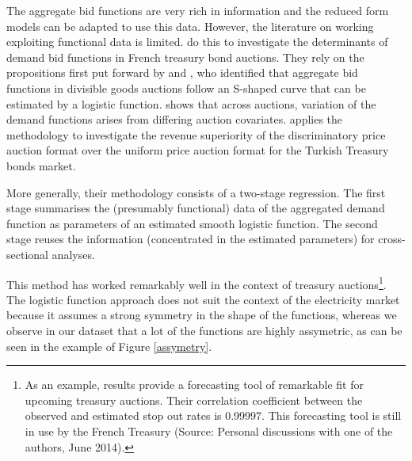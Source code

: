 The aggregate bid functions are very rich in information and the reduced form models can be adapted to use this data. However, the literature on working exploiting functional data is limited. \cite{pw2002etude} do this to investigate the determinants of demand bid functions in French treasury bond auctions. They rely on the propositions first put forward by %
\cite{boukai1998market}
and 
\cite{berg1999bid}, who identified that aggregate bid functions in divisible goods auctions follow an S-shaped curve that can be estimated by a logistic function. %
\cite{pw2002etude} shows that across auctions, variation of the demand functions arises from differing auction covariates. \cite{ozcan2004logistic} applies 
the methodology to investigate the revenue superiority of the discriminatory price auction format over the uniform price auction format for the Turkish Treasury bonds market.

More generally, their methodology consists of a two-stage regression. The first stage summarises the (presumably functional) data of the aggregated demand function as parameters of an estimated smooth logistic function. The second stage reuses the information (concentrated in the estimated parameters) for cross-sectional analyses. 

This method has worked remarkably well in the context of treasury auctions\footnote{As an example, \cite{pw2002etude} results provide a forecasting tool of remarkable fit for upcoming treasury auctions. Their correlation coefficient between the observed and estimated stop out rates is 0.99997. This forecasting tool is still in use by the French Treasury (Source: Personal discussions with one of the authors, June 2014).}.
The logistic function approach does not suit the context of the electricity market because it assumes a strong symmetry in the shape of the functions, whereas we observe in our dataset that a lot of the functions are highly assymetric, as can be seen in the example of Figure \ref{assymetry}. 


